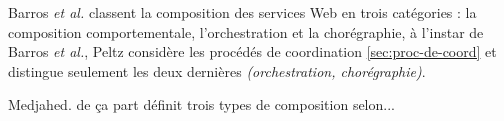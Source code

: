     Barros \emph{et al.} \cite{barros2006standards} classent la
    composition des services Web en trois catégories : la composition
    comportementale, l'orchestration et la chorégraphie, à l'instar de
    Barros \emph{et al.}, Peltz \cite{peltz2003web} considère les
    procédés de coordination \ref{sec:proc-de-coord} et distingue
    seulement les deux dernières \textit{(orchestration,
      chorégraphie)}.

    
    \newpage
    Medjahed.\cite{medjahed2004thesis} de ça part définit trois types
    de composition selon...


    

    
